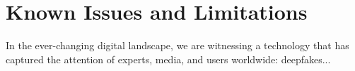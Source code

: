 \documentclass[../main.tex]{subfiles}
\begin{document}
\section{Known Issues and Limitations}\label{sec:issue_limitations}
In the ever-changing digital landscape, we are witnessing a technology that has captured the attention of experts, media, and users worldwide: deepfakes...
\end{document}
